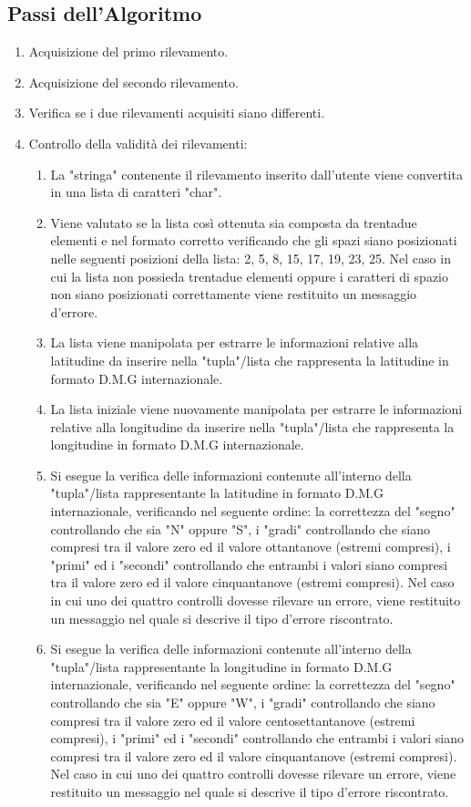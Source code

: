 \documentclass{article}
\begin{document}
\subsection{Passi dell'Algoritmo}
\begin{enumerate}
	\item Acquisizione del primo rilevamento.
	\item Acquisizione del secondo rilevamento.
	\item Verifica se i due rilevamenti acquisiti siano differenti.
	
	\item Controllo della validità dei rilevamenti:
	\begin{enumerate}
		\item La "stringa" contenente il rilevamento inserito dall'utente viene convertita in una lista di caratteri "char".
		\item Viene valutato se la lista così ottenuta sia composta da trentadue elementi e nel formato corretto verificando che gli spazi siano posizionati nelle  seguenti posizioni della lista: 2, 5, 8, 15, 17, 19, 23, 25. Nel caso in cui la lista non possieda trentadue elementi oppure i caratteri di spazio non siano posizionati correttamente viene restituito un messaggio d'errore.
		\item La lista viene manipolata per estrarre le informazioni relative alla latitudine da inserire nella "tupla"/lista che rappresenta la latitudine in formato D.M.G internazionale.
		\item La lista iniziale viene nuovamente manipolata per estrarre le informazioni relative alla longitudine da inserire nella "tupla"/lista che rappresenta la longitudine in formato D.M.G internazionale.
		\item Si esegue la verifica delle informazioni contenute all'interno della "tupla"/lista rappresentante la latitudine in formato D.M.G internazionale, verificando nel seguente ordine:  la correttezza del "segno" controllando che sia "N" oppure "S", i "gradi" controllando che siano compresi tra il valore zero ed il valore ottantanove (estremi compresi), i "primi" ed i "secondi" controllando che entrambi i valori siano compresi tra il valore zero ed il valore cinquantanove (estremi compresi). Nel caso in cui uno dei quattro controlli dovesse rilevare un errore, viene restituito un messaggio nel quale si descrive il tipo d'errore riscontrato.
		\item Si esegue la verifica delle informazioni contenute all'interno della "tupla"/lista rappresentante la longitudine in formato D.M.G internazionale, verificando nel seguente ordine:  la correttezza del "segno" controllando che sia "E" oppure "W", i "gradi" controllando che siano compresi tra il valore zero ed il valore centosettantanove (estremi compresi), i "primi" ed i "secondi" controllando che entrambi i valori siano compresi tra il valore zero ed il valore cinquantanove (estremi compresi). Nel caso in cui uno dei quattro controlli dovesse rilevare un errore, viene restituito un messaggio nel quale si descrive il tipo d'errore riscontrato.
	\end{enumerate}


\end{enumerate}
\end{document}

